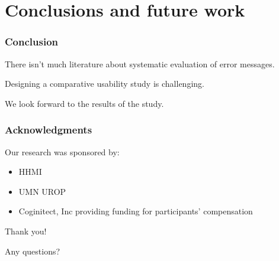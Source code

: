 \documentclass{beamer}
\begin{document}
\section{Conclusions and future work} 

\begin{frame}
\frametitle{Conclusion}
There isn't much literature about systematic evaluation of error messages.

Designing a comparative usability study is challenging.

We look forward to the results of the study.  

\end{frame}

\begin{frame}
\frametitle{Acknowledgments}
	Our research was sponsored by:
	\begin{itemize}
	\item HHMI
	\item UMN UROP
          \item Coginitect, Inc providing funding for participants' compensation 
	\end{itemize}
	
	
	{\centering
	\noindent
	Thank you! \par
	Any questions? \par
	}
\end{frame}
\end{document}
